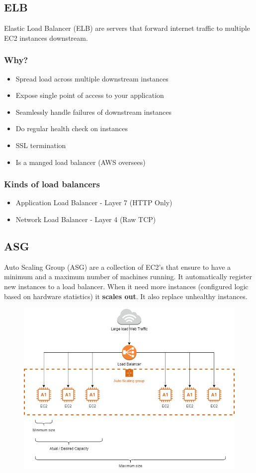 \subsection{ELB}
Elastic Load Balancer (ELB) are servers that forward internet traffic to multiple EC2 instances downstream.

\subsubsection{Why?}
\begin{itemize}
	\item{Spread load across multiple downstream instances}
	\item{Expose single point of access to your application}
	\item{Seamlessly handle failures of downstream instances}
	\item{Do regular health check on instances}
	\item{SSL termination}
	\item{Is a manged load balancer (AWS oversees)} 
\end{itemize}

\subsubsection{Kinds of load balancers}
\begin{itemize}
	\item{Application Load Balancer} - Layer 7 (HTTP Only)
	\item{Network Load Balancer} - Layer 4 (Raw TCP)
\end{itemize}

\subsection{ASG}
Auto Scaling Group (ASG) are a collection of EC2's that ensure to have a minimum and a maximum number of machines running. It automatically register new instances to a load balancer. When it need more instances (configured logic based on hardware statistics) it \textbf{scales out}. It also replace unhealthy instances.

\begin{figure}[h]
\includegraphics[scale=0.5]{elb_asg/elb_asg}
\centering
\end{figure}
